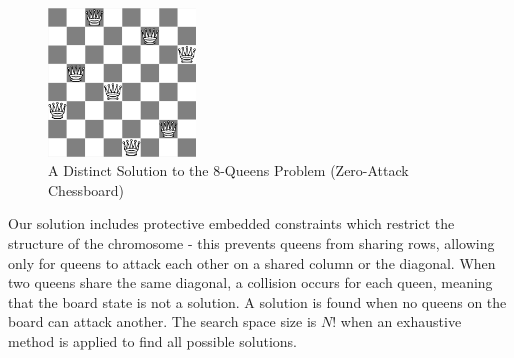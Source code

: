 \documentclass[conference]{IEEEtran}
\begin{document}
\begin{figure}[h!]
\centerline{\includegraphics[width=0.35\textwidth]{figures/8_queens_solution.png}}
\caption{A Distinct Solution to the 8-Queens Problem (Zero-Attack Chessboard)}
\label{fig:solution}
\end{figure}



Our solution includes protective embedded constraints which restrict the structure of the chromosome - this prevents queens from sharing rows, allowing only for queens to attack each other on a shared column or the diagonal. When two queens share the same diagonal, a collision occurs for each queen, meaning that the board state is not a solution. A solution is found when no queens on the board can attack another. The search space size is {$N!$} when an exhaustive method is applied to find all possible solutions. 
\end{document}

